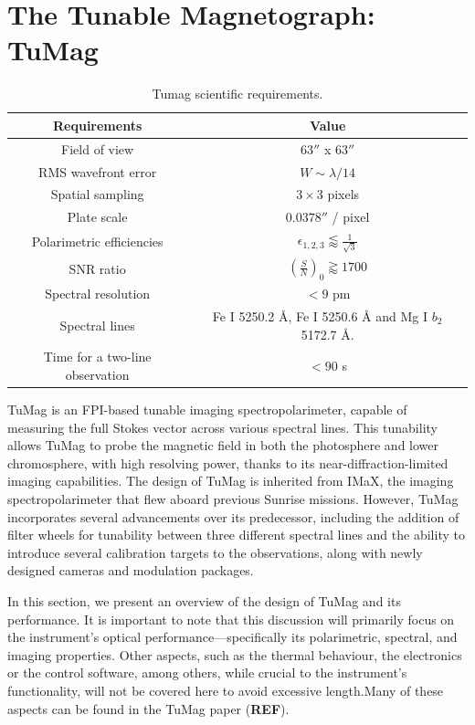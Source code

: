\section{The Tunable Magnetograph: TuMag}

\begin{table}
    \centering
   \begin{tabular}{cc}
    \hline
    \hline
    Requirements & Value \\
    \hline
    Field of view & $63''$ x $63''$ \\
    RMS wavefront error & $W \sim \lambda / 14$\\
    Spatial sampling & $3 \times 3 $ pixels \\
    Plate scale & $0.0378''$ / pixel \\
    Polarimetric efficiencies & $\epsilon _ {1, 2, 3} \lessapprox \frac{1}{\sqrt{3}}$\\
    SNR ratio & $\left(\frac{S}{N}\right) _ 0 \gtrapprox 1700$ \\
    Spectral resolution & $< 9$ pm\\  
    Spectral lines & Fe I 5250.2 \r{A}, Fe I 5250.6 \r{A} and Mg I $b_2$ 5172.7 \r{A}. \\
    Time for a two-line observation & $< 90$ s\\
    \hline
    \hline
    \end{tabular}
    \caption{Tumag scientific requirements.}
    \label{table: Tumags requirements}
\end{table}

TuMag is an FPI-based tunable imaging spectropolarimeter, capable of measuring the full Stokes vector across various spectral lines. This tunability allows TuMag to probe the magnetic field in both the photosphere and lower chromosphere, with high resolving power, thanks to its near-diffraction-limited imaging capabilities. The design of TuMag is inherited from IMaX, the imaging spectropolarimeter that flew aboard previous Sunrise missions. However, TuMag incorporates several advancements over its predecessor, including the addition of filter wheels for tunability between three different spectral lines and the ability to introduce several calibration targets to the observations, along with newly designed cameras and modulation packages.

In this section, we present an overview of the design of TuMag  and its performance. It is important to note that this discussion will primarily focus on the instrument's optical performance—specifically its polarimetric, spectral, and imaging properties. Other aspects, such as the thermal behaviour, the electronics or the control software, among others, while crucial to the instrument's functionality, will not be covered here to avoid excessive length.Many of these aspects can be found in the TuMag paper (\textbf{REF}).

